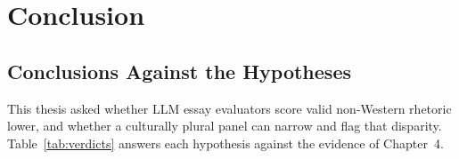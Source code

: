 \chapter{Conclusion}
\label{chap:conclusion}

\section{Conclusions Against the Hypotheses}

This thesis asked whether LLM essay evaluators score valid
non-Western rhetoric lower, and whether a culturally plural panel
can narrow and flag that disparity. Table~\ref{tab:verdicts} answers
each hypothesis against the evidence of Chapter~4.

